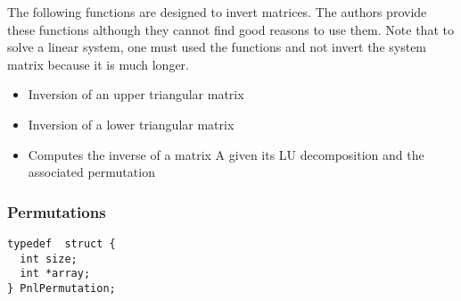 The following functions are designed to invert matrices. The authors provide
these functions although they cannot find good reasons to use them. Note that
to solve a linear system, one must used the  functions and not
invert the system matrix because it is much longer.
\begin{itemize}
\item {}
  \sshortdescribe Inversion of an upper triangular matrix  

\item {}
  \sshortdescribe Inversion of a lower triangular matrix  

\item {} 
  \sshortdescribe Computes the inverse of a matrix A given its LU
  decomposition and the associated permutation   
\end{itemize}

\subsubsection{Permutations}

\begin{verbatim}
typedef  struct {
  int size;
  int *array;
} PnlPermutation;
\end{verbatim}

